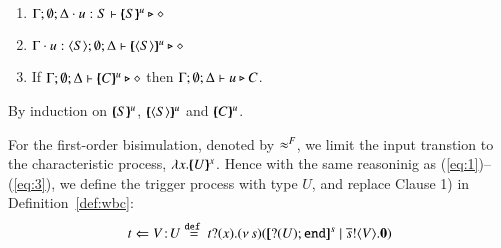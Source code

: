 


\begin{proposition}\rm
\label{pro:characteristic}
\begin{enumerate}
\item $\Gamma; \emptyset; \Delta \cdot u:S \vdash [\!\!(S)\!\!]^{u} \triangleright \diamond$ 
\item $\Gamma \cdot u:\langle S \rangle; \emptyset; \Delta \vdash [\!\!(\langle S \rangle)\!\!]^{u} \triangleright \diamond$
\item 	If $\Gamma; \emptyset; \Delta \vdash [\!\!(C)\!\!]^{u} \triangleright \diamond$
	then
	$\Gamma; \emptyset; \Delta \vdash u \triangleright C$.
\end{enumerate}
\end{proposition}
\begin{IEEEproof}
	By induction on $[\!\!(S)\!\!]^{u}$, $[\!\!(\langle S \rangle)\!\!]^{u}$
and $[\!\!(C)\!\!]^{u}$. 
\end{IEEEproof}

\smallskip 

For the first-order bisimulation, 
denoted by $\approx^F$, we limit the input transtion to 
the characteristic process, $\lambda x.[\!\!(U)\!\!]^{x}$. 
Hence with the same reasoninig as (\ref{eq:1})--(\ref{eq:3}), 
we define the trigger process with type 
$U$, and replace Clause 1) in Definition~\ref{def:wbc}:
\begin{equation}\label{eq:4}
	\ftrigger{t}{V}{U} \defeq 
\fotrigger{t}{x}{s}{\btinp{U} \tinact}{V}
\end{equation}

